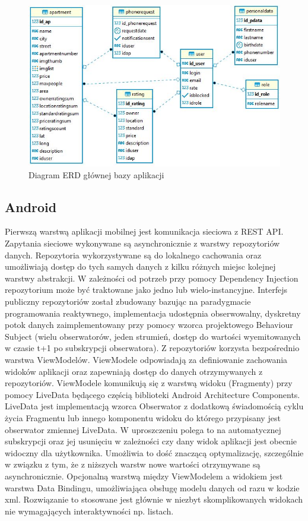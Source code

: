 \documentclass[polish, 11pt]{article}
\begin{document}
            \begin{figure}[H]
                \centering
                \includegraphics[width=\textwidth]{figures/TrueHomeERD.jpg}
                \caption{Diagram ERD głównej bazy aplikacji}
            \end{figure}
        
    \subsection{Android}
    
    Pierwszą warstwą aplikacji mobilnej jest komunikacja sieciowa z REST API. Zapytania sieciowe wykonywane są asynchronicznie z warstwy repozytoriów danych. Repozytoria wykorzystywane są do lokalnego cachowania oraz umożliwiają dostęp do tych samych danych z kilku różnych miejsc kolejnej warstwy abstrakcji. W zależności od potrzeb przy pomocy Dependency Injection repozytorium może być traktowane jako jedno lub wielo-instancyjne. Interfejs publiczny repozytoriów został zbudowany bazując na paradygmacie programowania reaktywnego, implementacja udostępnia obserwowalny, dyskretny potok danych zaimplementowany przy pomocy wzorca projektowego Behaviour Subject (wielu obserwatorów, jeden strumień, dostęp do wartości wyemitowanych w czasie t+1 po subskrypcji obserwatora). Z repozytoriów korzysta bezpośrednio warstwa ViewModelów. ViewModele odpowiadają za definiowanie zachowania widoków aplikacji oraz zapewniają dostęp do danych otrzymywanych z repozytoriów.
    ViewModele komunikują się z warstwą widoku (Fragmenty) przy pomocy LiveData będącego częścią biblioteki Android Architecture Components. LiveData jest implementacją wzorca Obserwator z dodatkową świadomością cyklu życia Fragmentu lub innego komponentu widoku do którego przypisany jest obserwator zmiennej LiveData. W uproszczeniu polega to na automatycznej subskrypcji oraz jej usunięciu w zależności czy dany widok aplikacji jest obecnie widoczny dla użytkownika. Umożliwia to dość znaczącą optymalizację, szczególnie w związku z tym, że z niższych warstw nowe wartości otrzymywane są asynchronicznie. Opcjonalną warstwą między ViewModelem a widokiem jest warstwa Data Bindingu, umożliwiająca obsługę modelu danych od razu w kodzie xml. Rozwiązanie to stosowane jest głównie w niezbyt skomplikowanych widokach nie wymagających interaktywności np. listach.
    
\end{document}
